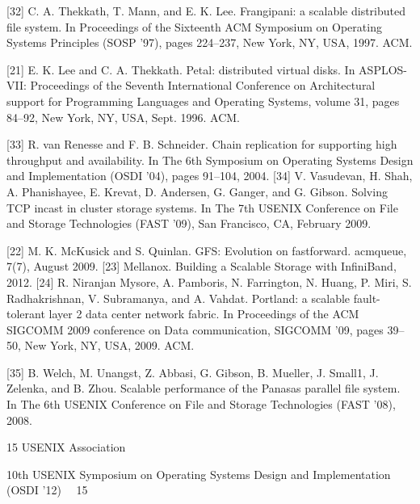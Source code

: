 [32] C. A. Thekkath, T. Mann, and E. K. Lee. Frangipani: a scalable distributed file system. In Proceedings of the Sixteenth ACM
Symposium on Operating Systems Principles (SOSP ’97), pages
224–237, New York, NY, USA, 1997. ACM.

[21] E. K. Lee and C. A. Thekkath. Petal: distributed virtual disks. In
ASPLOS-VII: Proceedings of the Seventh International Conference on Architectural support for Programming Languages and
Operating Systems, volume 31, pages 84–92, New York, NY,
USA, Sept. 1996. ACM.

[33] R. van Renesse and F. B. Schneider. Chain replication for supporting high throughput and availability. In The 6th Symposium
on Operating Systems Design and Implementation (OSDI ’04),
pages 91–104, 2004.
[34] V. Vasudevan, H. Shah, A. Phanishayee, E. Krevat, D. Andersen,
G. Ganger, and G. Gibson. Solving TCP incast in cluster storage
systems. In The 7th USENIX Conference on File and Storage
Technologies (FAST ’09), San Francisco, CA, February 2009.

[22] M. K. McKusick and S. Quinlan. GFS: Evolution on fastforward. acmqueue, 7(7), August 2009.
[23] Mellanox. Building a Scalable Storage with InfiniBand, 2012.
[24] R. Niranjan Mysore, A. Pamboris, N. Farrington, N. Huang,
P. Miri, S. Radhakrishnan, V. Subramanya, and A. Vahdat. Portland: a scalable fault-tolerant layer 2 data center network fabric.
In Proceedings of the ACM SIGCOMM 2009 conference on Data
communication, SIGCOMM ’09, pages 39–50, New York, NY,
USA, 2009. ACM.

[35] B. Welch, M. Unangst, Z. Abbasi, G. Gibson, B. Mueller,
J. Small1, J. Zelenka, and B. Zhou. Scalable performance of the
Panasas parallel file system. In The 6th USENIX Conference on
File and Storage Technologies (FAST ’08), 2008.

15
USENIX Association  

10th USENIX Symposium on Operating Systems Design and Implementation (OSDI ’12)  15


